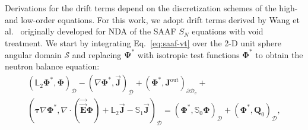 Derivations for the drift terms depend on the discretization schemes of the high- and low-order
equations. For this work, we adopt drift terms derived by Wang et al.\
\cite{wang_diffusion_2014, wang_rattlesnake_2018} originally developed for \gls{NDA} of the
\gls{SAAF} $S_N$ equations with void treatment. We start by integrating Eq.\ \ref{eq:saaf-vt}
over the 2-D unit sphere angular domain $\mathcal{S}$ and replacing $\bm{\Psi}^*$ with isotropic
test functions $\bm{\Phi}^*$ to obtain the neutron balance equation:
%
\begin{multline}
  \left(\mathbb{L}_2\bm{\Phi}^*,\bm{\Phi}\right)_\mathcal{D}
  - \left(\nabla\bm{\Phi}^*,\vec{\bm{J}}\right)_\mathcal{D}
  + \left(\bm{\Phi}^*,\bm{J}^\text{out}\right)_{\partial\mathcal{D}_v} + \\
  \left(\bm{\tau}\nabla\bm{\Phi}^*,
    \nabla\cdot(\vec{\vec{\bm{E}}}\bm{\Phi}) +\mathbb{L}_2\vec{\bm{J}} -
    \mathbb{S}_1\vec{\bm{J}}\right)_\mathcal{D}
  = \left(\bm{\Phi}^*,\mathbb{S}_0\bm{\Phi}\right)_\mathcal{D}
  + \left(\bm{\Phi}^*,\bm{Q}_0\right)_\mathcal{D},
\end{multline}
%
